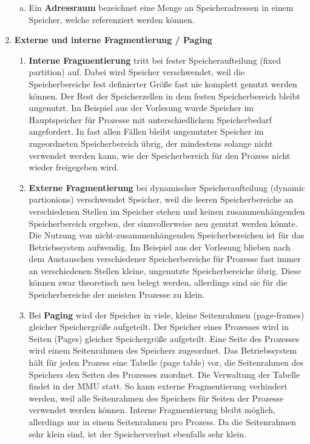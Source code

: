 \documentclass[numbers=noendperiod]{scrartcl}
\begin{document}
\begin{enumerate}[1.]
\begin{enumerate}[a)]
		\item Ein \textbf{Adressraum} bezeichnet eine Menge an Speicheradressen in einem Speicher, welche referenziert werden können.
	\end{enumerate}
	
	\item \textbf{Externe und interne Fragmentierung / Paging}
		\begin{enumerate}
			\item \textbf{Interne Fragmentierung} tritt bei fester Speicheraufteilung (fixed partition) auf. Dabei wird Speicher verschwendet, weil die Speicherbereiche fest definierter Größe fast nie komplett genutzt werden können. Der Rest der Speicherzellen in dem festen Speicherbereich bleibt ungenutzt. Im Beispiel aus der Vorlesung wurde Speicher im Hauptspeicher für Prozesse mit unterschiedlichem Speicherbedarf angefordert. In fast allen Fällen bleibt ungenutzter Speicher im zugeordneten Speicherbereich übrig, der mindestens solange nicht verwendet werden kann, wie der Speicherbereich für den Prozess nicht wieder freigegeben wird.
			 
			\item \textbf{Externe Fragmentierung} bei dynamischer Speicheraufteilung (dynamic partionions) verschwendet Speicher, weil die leeren Speicherbereiche an verschiedenen Stellen im Speicher stehen und keinen zusammenhängenden Speicherbereich ergeben, der sinnvollerweise neu genutzt werden könnte. Die Nutzung von nicht-zusammenhängenden Speicherbereichen ist für das Betriebssystem aufwendig. Im Beispiel aus der Vorlesung blieben nach dem Austauschen verschiedener Speicherbereiche für Prozesse fast immer an verschiedenen Stellen kleine, ungenutzte Speicherbereiche übrig. Diese können zwar theoretisch neu belegt werden, allerdings sind sie für die Speicherbereiche der meisten Prozesse zu klein.
			\item Bei \textbf{Paging} wird der Speicher in viele, kleine Seitenrahmen (page-frames) gleicher Speichergröße aufgeteilt. Der Speicher eines Prozesses wird in Seiten (Pages) gleicher Speichergröße aufgeteilt. Eine Seite des Prozesses wird einem Seitenrahmen des Speichers zugeordnet. Das Betriebssystem hält für jeden Prozess eine Tabelle (page table) vor, die Seitenrahmen des Speichers den Seiten des Prozesses zuordnet. Die Verwaltung der Tabelle findet in der MMU statt. So kann externe Fragmentierung verhindert werden, weil alle Seitenrahmen des Speichers für Seiten der Prozesse verwendet werden können. Interne Fragmentierung bleibt möglich, allerdings nur in einem Seitenrahmen pro Prozess. Da die Seitenrahmen sehr klein sind, ist der Speicherverlust ebenfalls sehr klein.
				

\end{enumerate}
\end{enumerate}
\end{document}
